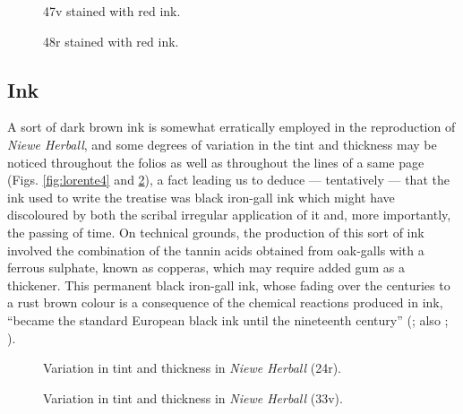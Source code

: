 \begin{paper}
\begin{figure}[H]
  \centering
  \begin{minipage}[b]{0.43\textwidth}
    \caption{47v stained with red ink.}
    \label{fig:lorente2}
  \end{minipage}
  \hfill
  \begin{minipage}[b]{0.46\textwidth}
    \caption{48r stained with red ink.}
    \label{fig:lorente3}
  \end{minipage}
\end{figure}

\subsection{Ink}

A sort of dark brown ink is somewhat erratically employed in the
reproduction of \emph{Niewe Herball}, and some degrees of variation in
the tint and thickness may be noticed throughout the folios as well as
throughout the lines of a same page (Figs. \ref{fig:lorente4} and \ref{fig:lorente5}), a fact leading us to
deduce –– tentatively –– that the ink used to write the
treatise was black iron-gall ink which might have discoloured by both
the scribal irregular application of it and, more importantly, the
passing of time. On technical grounds, the production of this sort of
ink involved the combination of the tannin acids obtained from oak-galls
with a ferrous sulphate, known as copperas, which may require added gum
as a thickener. This permanent black iron-gall ink, whose fading over
the centuries to a rust brown colour is a consequence of the chemical
reactions produced in ink, ``became the standard European black ink
until the nineteenth century'' (\cite[149--150]{mathisen_palaeography_2008}; also \cite[7]{petti_english_1977}; \cite[32]{de_hamel_scribes_1992}).

\begin{figure}[H]
  \centering
  \begin{minipage}[b]{0.45\textwidth}
    \caption{Variation in tint and thickness in \emph{Niewe Herball} (24r).}
    \label{fig:lorente4}
  \end{minipage}
  \hfill
  \begin{minipage}[b]{0.45\textwidth}
    \caption{Variation in tint and thickness in \emph{Niewe Herball} (33v).}
    \label{fig:lorente5}
  \end{minipage}
\end{figure}


\end{paper}
